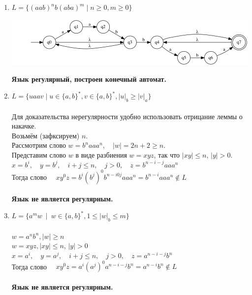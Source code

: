 \documentclass{article}
\begin{document}
\begin{enumerate}
    \item {$ L = \{(a a b)^{n} b(a b a)^{m} \mid n \ge 0, m \ge 0 \}$} \\
        \begin{center}
            \includegraphics[width=1\textwidth]{g41.png}
        \end{center}
        \textbf{Язык регулярный, построен конечный автомат.} \\

    \item {$L = \{{u a a v \mid u \in \{a, b\}^*, v \in \{a, b\}^*, |u|_b \ge |v|_a}\} $}\\ \\
        Для доказательства нерегулярности удобно использовать отрицание леммы о накачке. \\
        Возьмём (зафксируем) $n$. \\
        Рассмотрим слово $w = b^naaa^n, \quad |w| = 2n+2 \geq  n$. \\
        Представим слово $w$ в виде разбиения $w=xyz$, так что $|xy| \leq n$, $|y| > 0$. \\
        $x = b^i, \quad y = b^j,  \quad i+j \leq n, \quad j > 0, \quad z = b^{n-i-j}aaa^n$ \\
        Тогда слово $\quad x y^0 z = b^i (b^j)^0 b^{n-i0j} a a a^n = b^{n-i} a a a^n \notin L$ \\ \\
        \textbf{Язык не является регулярным.} \\
        
   \item {$L = \{ a^mw \ \mid \ w \in \{ a,b \}^*, 1 \leq |w|_b \leq m \}$} \\ \\
        $w = a^n b^n , |w| \geq n$ \\
        $w = xyz, |xy| \leq n$, $|y| > 0$ \\
        $x = a^i, \quad y = a^j, \quad i+j \leq n, \quad j > 0, \quad z = a^{n-i-j}b^n$ \\
        Тогда слово $\quad x y^0 z = a^i (a^j)^0 a^{n-i-j} b^n = a^{n-i} b^n \notin L$ \\ \\
        \textbf{Язык не является регулярным.} \\
        

\end{enumerate}
\end{document}
